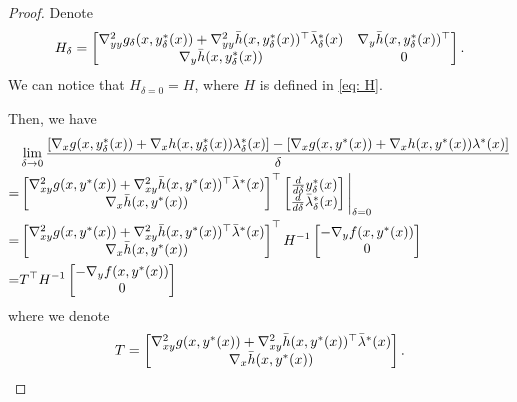 \documentclass{article}
\theoremstyle{plain}
\theoremstyle{definition}
\theoremstyle{remark}
\begin{document}
\begin{proof}
Denote
\begin{align}\label{eq: H delta}
H_\delta=\begin{bmatrix}
\nabla^2_{yy} g_\delta(x, y^*_\delta(x))+\nabla^2_{yy}\Bar{h}(x,y^*_\delta(x))^\top\Bar{\lambda}^*_\delta(x) & \nabla_y\Bar{h}(x,y^*_\delta(x))^\top \\
\nabla_y\Bar{h}(x,y^*_\delta(x)) & 0
\end{bmatrix}.
\end{align}
We can notice that $H_{\delta=0}=H$, where $H$ is defined in \eqref{eq: H}.

Then, we have
\begin{align*}
    &\lim_{\delta\to 0}\frac{[\nabla_x g(x, y^*_\delta(x))+\nabla_x h(x, y^*_\delta(x))\lambda^*_\delta(x)]-[\nabla_x g(x, y^*(x))+\nabla_x h(x, y^*(x))\lambda^*(x)]}{\delta}\\
    =&\begin{bmatrix}
\nabla^2_{xy} g(x, y^*(x))+\nabla^2_{xy}\Bar{h}(x,y^*(x))^\top\Bar{\lambda}^*(x)\\
\nabla_x\Bar{h}(x,y^*(x))
\end{bmatrix}^\top\begin{bmatrix}
\frac{d}{d \delta} y^*_\delta(x) \\
\frac{d}{d \delta} \Bar{\lambda}^*_\delta(x)
\end{bmatrix}\Bigg|_{\delta=0}\\
=&\begin{bmatrix}
\nabla^2_{xy} g(x, y^*(x))+\nabla^2_{xy}\Bar{h}(x,y^*(x))^\top\Bar{\lambda}^*(x)\\
\nabla_x\Bar{h}(x,y^*(x))
\end{bmatrix}^\top H^{-1} \begin{bmatrix}
-\nabla_y f(x, y^*(x))\\
0
\end{bmatrix}\\
=&T^\top H^{-1} \begin{bmatrix}
-\nabla_y f(x, y^*(x))\\
0
\end{bmatrix}\\
\end{align*}
where we denote
\begin{align*}
    T=\begin{bmatrix}
\nabla^2_{xy} g(x, y^*(x))+\nabla^2_{xy}\Bar{h}(x,y^*(x))^\top\Bar{\lambda}^*(x)\\
\nabla_x\Bar{h}(x,y^*(x))
\end{bmatrix}.
\end{align*}

\end{proof}
\end{document}
